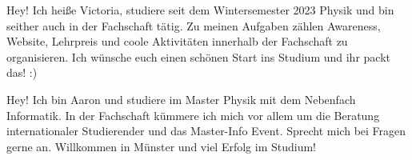\begin{multicols}{2}
{
Hey! Ich heiße Victoria, studiere seit dem Wintersemester 2023 Physik und bin seither auch in der Fachschaft tätig. Zu meinen Aufgaben zählen Awareness, Website, Lehrpreis und coole Aktivitäten innerhalb der Fachschaft zu organisieren. Ich wünsche euch einen schönen Start ins Studium und ihr packt das! :) 
}

\vspace{-0.1cm}

{
Hey! Ich bin Aaron und studiere im Master Physik mit dem Nebenfach Informatik. In der Fachschaft kümmere ich mich vor allem um die Beratung internationaler Studierender und das Master-Info Event. Sprecht mich bei Fragen gerne an. Willkommen in Münster und viel Erfolg im Studium!
}


\end{multicols}

